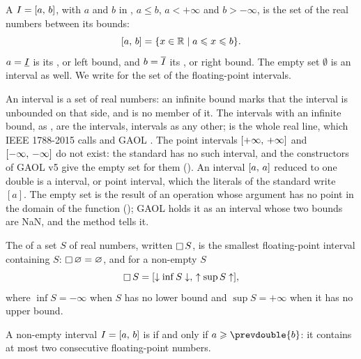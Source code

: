 \documentclass[12pt,a4paper,twoside,openright]{book}
\begin{document}
\begin{Def}\label{def:interval}
A  $I=[a,\,b]$, with $a$ and $b$ in \FSet,
$a\leq b$, $a<+\infty$ and $b>-\infty$, is the set of the real numbers
between its bounds:
\begin{equation*}
  [a,\,b]=\{x\in\mathbb{R}\mid a\leqslant x\leqslant b\}.
\end{equation*}
$a=\underline{I}$ is its , or left bound, and
$b=\overline{I}$ its , or right bound. The empty set
$\emptyset$ is an interval as well. We write \ISet{} for the set of the
floating-point intervals.
\end{Def}

An interval is a set of real numbers: an infinite bound marks that the
interval is unbounded on that side, and is no member of it. The intervals
with an infinite bound, as , are the 
intervals, intervals as any other; \itv{-\infty}{+\infty} is the whole real
line, which IEEE 1788-2015 calls  and GAOL
. The point intervals $[+\infty,\,+\infty]$
and $[-\infty,\,-\infty]$ do not exist: the standard has no such
interval, and the constructors of GAOL v5 give the empty set for them
().\newinvfive{} An interval $[a,\,a]$ reduced to
one double is a  interval, or point interval, which the
literals of the standard write $[a]$. The empty set is the result of an
operation whose argument has no point in the domain of the function
(); GAOL holds it as an interval whose two
bounds are NaN, and the method  tells it.
%

\begin{Def}[Hull]\label{def:hull}
%
The  of a set $S$ of real numbers, written $\mathop{\Box} S$, is the
smallest floating-point interval containing $S$: $\mathop{\Box} \varnothing=
\varnothing$, and for a non-empty $S$
\begin{equation*}
  \mathop{\Box} S=[\downarrow\inf S\downarrow,\,\uparrow\sup S\uparrow],
\end{equation*}
where $\inf S=-\infty$ when $S$ has no lower bound and $\sup S=+\infty$ when
it has no upper bound.
\end{Def}

\begin{Def}\label{def:canonical}
%
%
A non-empty interval $I=[a,\,b]$ is  if and only if
$a\geq\prevdouble{b}$: it contains at most two consecutive floating-point
numbers.
\end{Def}
\end{document}
